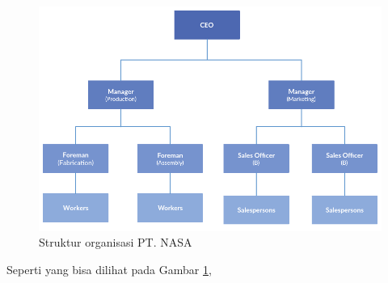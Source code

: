 \begin{figure} [ht] \centering
  \includegraphics[scale=0.4]{gambar/organization-structure.png}
  \caption{Struktur organisasi PT. NASA}
	\label{fig:OrganizationStructure}
\end{figure}

Seperti yang bisa dilihat pada Gambar \ref{fig:OrganizationStructure}, \lipsum[15]
